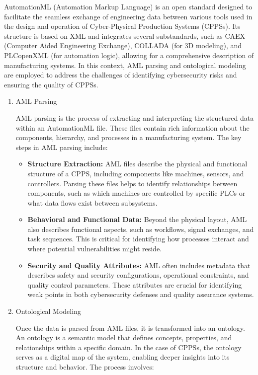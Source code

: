 \documentclass[conference]{IEEEtran}
\begin{document}
AutomationML (Automation Markup Language) is an open standard designed to facilitate the seamless exchange of engineering data between various tools used in the design and operation of Cyber-Physical Production Systems (CPPSs). Its structure is based on XML and integrates several substandards, such as CAEX (Computer Aided Engineering Exchange), COLLADA (for 3D modeling), and PLCopenXML (for automation logic), allowing for a comprehensive description of manufacturing systems. In this context, AML parsing and ontological modeling are employed to address the challenges of identifying cybersecurity risks and ensuring the quality of CPPSs.


\begin{enumerate}
    \item {AML Parsing}

AML parsing is the process of extracting and interpreting the structured data within an AutomationML file. These files contain rich information about the components, hierarchy, and processes in a manufacturing system. The key steps in AML parsing include:

\begin{itemize}
    \item \textbf{Structure Extraction:} AML files describe the physical and functional structure of a CPPS, including components like machines, sensors, and controllers. Parsing these files helps to identify relationships between components, such as which machines are controlled by specific PLCs or what data flows exist between subsystems.
    \item \textbf{Behavioral and Functional Data:} Beyond the physical layout, AML also describes functional aspects, such as workflows, signal exchanges, and task sequences. This is critical for identifying how processes interact and where potential vulnerabilities might reside.
    \item \textbf{Security and Quality Attributes:} AML often includes metadata that describes safety and security configurations, operational constraints, and quality control parameters. These attributes are crucial for identifying weak points in both cybersecurity defenses and quality assurance systems.
\end{itemize}


    \item{Ontological Modeling}

Once the data is parsed from AML files, it is transformed into an ontology. An ontology is a semantic model that defines concepts, properties, and relationships within a specific domain. In the case of CPPSs, the ontology serves as a digital map of the system, enabling deeper insights into its structure and behavior. The process involves:


\end{enumerate}
\end{document}
